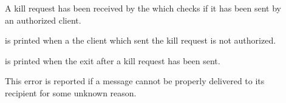 \begin{description}
\item[] A kill request has been
  received by the \MPA{} which checks if it has been sent by an authorized client.

\item[] is printed when a the client which sent the kill request is not
  authorized.

\item[] is printed when the
  \MPA{} exit after a kill request has been sent.

\item[]
This error is reported if a message cannot be properly delivered to
its recipient for some unknown reason.

\end{description}


